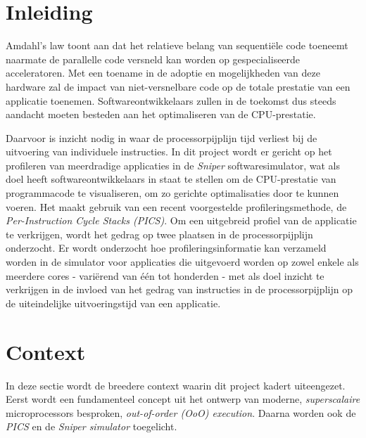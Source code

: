 \documentclass[12pt,a4paper,faculty=ea,language=nl]{ugent-doc}
\begin{document}
\maketitle

{\hypersetup{hidelinks}\tableofcontents}
\newpage

\section{Inleiding}
Amdahl's law toont aan dat het relatieve belang van sequentiële code toeneemt naarmate de parallelle code versneld kan worden op gespecialiseerde acceleratoren. Met een toename in de adoptie en mogelijkheden van deze hardware zal de impact van niet-versnelbare code op de totale prestatie van een applicatie toenemen. Softwareontwikkelaars zullen in de toekomst dus steeds aandacht moeten besteden aan het optimaliseren van de CPU-prestatie.

Daarvoor is inzicht nodig in waar de processorpijplijn tijd verliest bij de uitvoering van individuele instructies. In dit project wordt er gericht op het profileren van meerdradige applicaties in de \textit{Sniper} softwaresimulator, wat als doel heeft softwareontwikkelaars in staat te stellen om de CPU-prestatie van programmacode te visualiseren, om zo gerichte optimalisaties door te kunnen voeren. Het maakt gebruik van een recent voorgestelde profileringsmethode, de \textit{Per-Instruction Cycle Stacks (PICS)}. Om een uitgebreid profiel van de applicatie te verkrijgen, wordt het gedrag op twee plaatsen in de processorpijplijn onderzocht. Er wordt onderzocht hoe profileringsinformatie kan verzameld worden in de simulator voor applicaties die uitgevoerd worden op zowel enkele als meerdere cores - variërend van één tot honderden - met als doel inzicht te verkrijgen in de invloed van het gedrag van instructies in de processorpijplijn op de uiteindelijke uitvoeringstijd van een applicatie.


\newpage


\section{Context}
In deze sectie wordt de breedere context waarin dit project kadert uiteengezet. Eerst wordt een fundamenteel concept uit het ontwerp van moderne, \textit{superscalaire} microprocessors besproken, \textit{out-of-order (OoO) execution}. Daarna worden ook de \textit{PICS} en de \textit{Sniper simulator} toegelicht.
\end{document}
